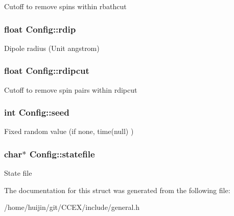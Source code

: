 Cutoff to remove spins within rbathcut \hypertarget{structConfig_af9d5e3a3b185555cbe04ad12733612b1}{
\subsubsection[{rdip}]{\setlength{\rightskip}{0pt plus 5cm}float Config\-::rdip}}\label{structConfig_af9d5e3a3b185555cbe04ad12733612b1}
Dipole radius (Unit angstrom) \hypertarget{structConfig_a39b6cf20220772b2326ddf423bf3a3f7}{
\subsubsection[{rdipcut}]{\setlength{\rightskip}{0pt plus 5cm}float Config\-::rdipcut}}\label{structConfig_a39b6cf20220772b2326ddf423bf3a3f7}
Cutoff to remove spin pairs within rdipcut \hypertarget{structConfig_a92ed038fd7676ed62640f59270a60545}{
\subsubsection[{seed}]{\setlength{\rightskip}{0pt plus 5cm}int Config\-::seed}}\label{structConfig_a92ed038fd7676ed62640f59270a60545}
Fixed random value (if none, time(null) ) \hypertarget{structConfig_a7ce40e0c9e172e7b2e213101b154760b}{
\subsubsection[{statefile}]{\setlength{\rightskip}{0pt plus 5cm}char$\ast$ Config\-::statefile}}\label{structConfig_a7ce40e0c9e172e7b2e213101b154760b}
State file 

The documentation for this struct was generated from the following file\-:\begin{DoxyCompactItemize}
\item 
/home/huijin/git/\-C\-C\-E\-X/include/general.\-h\end{DoxyCompactItemize}

